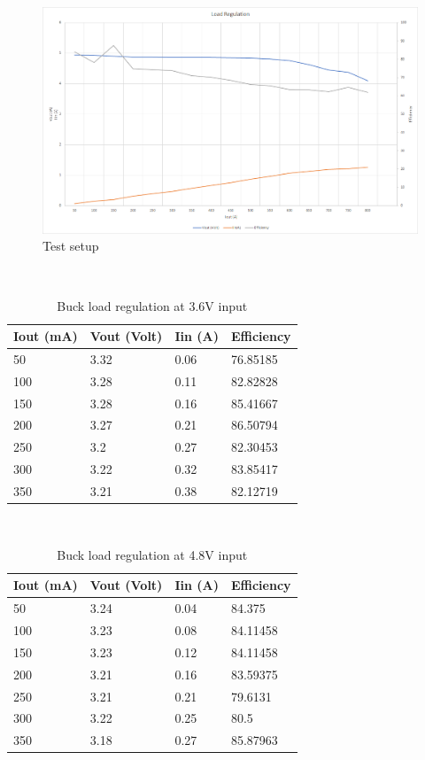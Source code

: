 \begin{figure}[H]
	\centering
	\includegraphics[width=\columnwidth]{IMGS/Boost load regulation at 4.2V Vin.png}
	\caption{Test setup}
	\label{fig:arch}
\end{figure}
\\
\begin{table}[H]
\centering
\begin{tabular}{|l|l|l|l|}
\hline
Iout (mA) & Vout (Volt) & Iin (A) & Efficiency \\ \hline
50        & 3.32        & 0.06    & 76.85185   \\ \hline
100       & 3.28        & 0.11    & 82.82828   \\ \hline
150       & 3.28        & 0.16    & 85.41667   \\ \hline
200       & 3.27        & 0.21    & 86.50794   \\ \hline
250       & 3.2         & 0.27    & 82.30453   \\ \hline
300       & 3.22        & 0.32    & 83.85417   \\ \hline
350       & 3.21        & 0.38    & 82.12719   \\ \hline
\end{tabular}
\caption{Buck load regulation at 3.6V input}
\label{table:4}
\end{table}
\\
\begin{table}[H]
\centering
\begin{tabular}{|l|l|l|l|}
\hline
Iout (mA) & Vout (Volt) & Iin (A) & Efficiency \\ \hline
50        & 3.24        & 0.04    & 84.375     \\ \hline
100       & 3.23        & 0.08    & 84.11458   \\ \hline
150       & 3.23        & 0.12    & 84.11458   \\ \hline
200       & 3.21        & 0.16    & 83.59375   \\ \hline
250       & 3.21        & 0.21    & 79.6131    \\ \hline
300       & 3.22        & 0.25    & 80.5       \\ \hline
350       & 3.18        & 0.27    & 85.87963   \\ \hline
\end{tabular}
\caption{Buck load regulation at 4.8V input}
\label{table:4}
\end{table}
